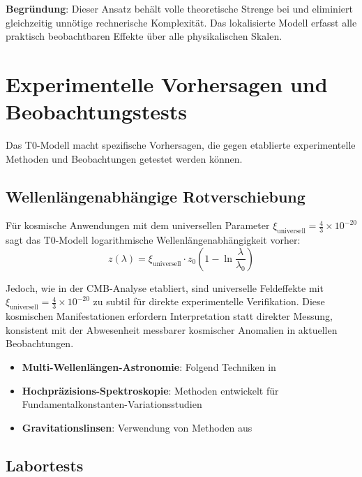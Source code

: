 \documentclass[12pt,a4paper]{article}
\begin{document}
	\textbf{Begründung}: Dieser Ansatz behält volle theoretische Strenge bei und eliminiert gleichzeitig unnötige rechnerische Komplexität. Das lokalisierte Modell erfasst alle praktisch beobachtbaren Effekte über alle physikalischen Skalen.
	\section{Experimentelle Vorhersagen und Beobachtungstests}
	\label{sec:experimental_tests}
	
	Das T0-Modell macht spezifische Vorhersagen, die gegen etablierte experimentelle Methoden und Beobachtungen getestet werden können.
	
	\subsection{Wellenlängenabhängige Rotverschiebung}
	\label{subsec:wavelength_redshift}
	
	Für kosmische Anwendungen mit dem universellen Parameter $\xi_{\text{universell}} = \frac{4}{3} \times 10^{-20}$ sagt das T0-Modell logarithmische Wellenlängenabhängigkeit vorher:
	\begin{equation}
		z(\lambda) = \xi_{\text{universell}} \cdot z_0\left(1 - \ln\frac{\lambda}{\lambda_0}\right)
	\end{equation}
	
	Jedoch, wie in der CMB-Analyse etabliert, sind universelle Feldeffekte mit $\xi_{\text{universell}} = \frac{4}{3} \times 10^{-20}$ zu subtil für direkte experimentelle Verifikation. Diese kosmischen Manifestationen erfordern Interpretation statt direkter Messung, konsistent mit der Abwesenheit messbarer kosmischer Anomalien in aktuellen Beobachtungen.
	
	\begin{itemize}
		\item \textbf{Multi-Wellenlängen-Astronomie}: Folgend Techniken in \citep{longair2011,carroll2006}
		\item \textbf{Hochpräzisions-Spektroskopie}: Methoden entwickelt für Fundamentalkonstanten-Variationsstudien \citep{uzan2003,murphy2003}
		\item \textbf{Gravitationslinsen}: Verwendung von Methoden aus \citep{schneider1992,bartelmann2001}
	\end{itemize}
	
	\subsection{Labortests}
	\label{subsec:laboratory_tests}
	
\end{document}
